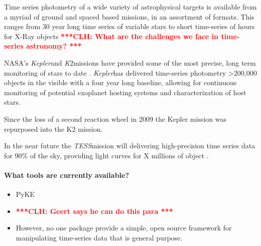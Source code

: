 \documentclass[twocolumn]{aastex62}
\newcommand{\ktwo}{{\it K$\mathit{2}$}}
\newcommand{\tess}{{\it TESS}}
\newcommand{\kepler}{{\it Kepler}}
\newcommand{\clh}[1]{\textcolor{red}{ \textbf{***CLH: #1 ***}}}
\begin{document}
Time series photometry of a wide variety of astrophysical targets is available from a
myriad of ground and spaced based missions, in an assortment of formats. This ranges
from 30 year long time series of variable stars\cite{citationneeded} to short
time-series of hours for X-Ray objects
\clh{What are the challenges we face in time-series astronomy?}

NASA's \kepler and \ktwo missions have provided some of the most precise, long term monitoring of stars to date \cite{citationneeded}. \kepler has delivered time-series photometry >200,000 objects in the visible with a four year long baseline, allowing for continuous monitoring of potential exoplanet hosting systems and characterization of host stars.

Since the loss of a second reaction wheel in 2009 the Kepler mission was repurposed into the K2 mission.

In the near future the \tess mission will delivering high-precision time series data for 90\% of the sky, providing light curves for X millions of object \cite{citationneeded}.


\paragraph{What tools are currently available?}
\begin{itemize}
\item PyKE
\item \clh{Geert says he can do this para}
\item However, no one package provide a simple, open source framework for manipulating time-series data that is general purpose.
\end{itemize}
\end{document}
